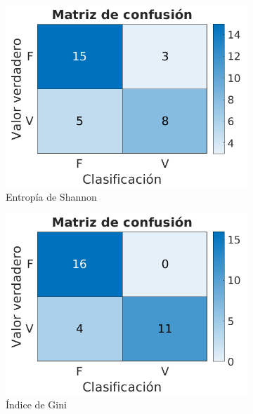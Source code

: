 \documentclass[a4paper]{article}
\begin{document}
  \begin{figure}[h]
    \centering
    \begin{subfigure}{.4\textwidth}
      \centering
      \includegraphics[width=\linewidth]{img/cm-shannon.png}
      \caption{Entropía de Shannon}
      \label{titanic-cm:sfig1}
    \end{subfigure}%
    \begin{subfigure}{.4\textwidth}
      \centering
      \includegraphics[width=\linewidth]{img/cm-gini.png}
      \caption{Índice de Gini}
      \label{titanic-cm:sfig2}
    \end{subfigure}
    \begin{subfigure}{.4\textwidth}
      \centering

\end{subfigure}
\end{figure}
\end{document}
